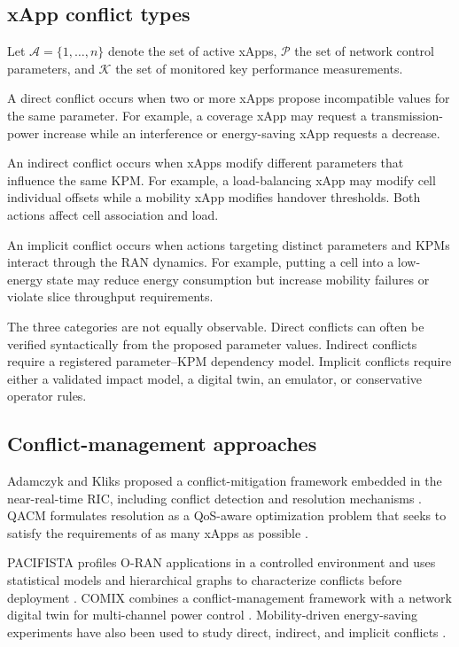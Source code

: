 \documentclass[pdflatex,sn-mathphys-num,iicol,oneside]{sn-jnl}
\begin{document}
\subsection{xApp conflict types}

Let $\mathcal{A}=\{1,\ldots,n\}$ denote the set of active xApps,
$\mathcal{P}$ the set of network control parameters, and
$\mathcal{K}$ the set of monitored key performance measurements.

A direct conflict occurs when two or more xApps propose incompatible
values for the same parameter. For example, a coverage xApp may
request a transmission-power increase while an interference or
energy-saving xApp requests a decrease.

An indirect conflict occurs when xApps modify different parameters
that influence the same KPM. For example, a load-balancing xApp may
modify cell individual offsets while a mobility xApp modifies
handover thresholds. Both actions affect cell association and load.

An implicit conflict occurs when actions targeting distinct
parameters and KPMs interact through the RAN dynamics. For example,
putting a cell into a low-energy state may reduce energy consumption
but increase mobility failures or violate slice throughput
requirements.

The three categories are not equally observable. Direct conflicts can
often be verified syntactically from the proposed parameter values.
Indirect conflicts require a registered parameter--KPM dependency
model. Implicit conflicts require either a validated impact model, a
digital twin, an emulator, or conservative operator rules.

\subsection{Conflict-management approaches}

Adamczyk and Kliks proposed a conflict-mitigation framework embedded
in the near-real-time RIC, including conflict detection and
resolution mechanisms \cite{adamczyk2023conflict}. QACM formulates
resolution as a QoS-aware optimization problem that seeks to satisfy
the requirements of as many xApps as possible
\cite{wadud2024qacm}.

PACIFISTA profiles O-RAN applications in a controlled environment and
uses statistical models and hierarchical graphs to characterize
conflicts before deployment \cite{prever2025pacifista}. COMIX
combines a conflict-management framework with a network digital twin
for multi-channel power control
\cite{giannopoulos2025comix}. Mobility-driven energy-saving
experiments have also been used to study direct, indirect, and
implicit conflicts \cite{wadud2025mobility}.
\end{document}
